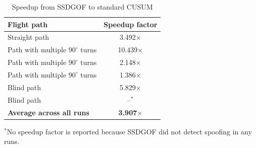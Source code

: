 \begin{table}[!ht]
\centering
\scriptsize
\caption{Speedup from SSDGOF to standard CUSUM}
\label{tab:ssdgof_to_cusum_speedup}
\begin{tabular}{|p{}|c|}
\hline
\textbf{Flight path} & \textbf{Speedup factor} \\
\hline
Straight path & 3.492$\times$ \\
\hline
Path with multiple $90^\circ$ turns & 10.439$\times$ \\
\hline
Path with multiple $90^\circ$ turns & 2.148$\times$ \\
\hline
Path with multiple $90^\circ$ turns & 1.386$\times$ \\
\hline
Blind path & 5.829$\times$ \\
\hline
Blind path & --$^{*}$ \\
\hline
\textbf{Average across all runs} & \textbf{3.907$\times$} \\
\hline
\end{tabular}

\vspace{0.5em}
\raggedright
\scriptsize{$^{*}$No speedup factor is reported because SSDGOF did not detect spoofing in any runs.}
\end{table}
